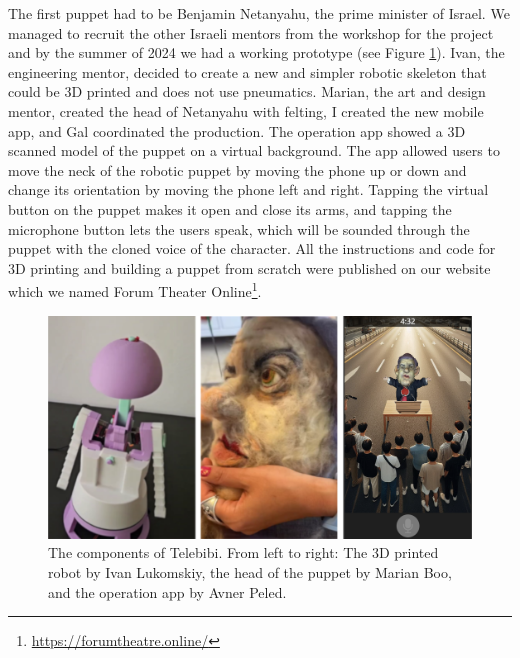 \documentclass[dissertation,math,vertlayout,pdfa,colorlinks]{aaltoseries}
\begin{document}
The first puppet had to be Benjamin Netanyahu, the prime minister of Israel. We managed to recruit the other Israeli mentors from the workshop for the project and by the summer of 2024 we had a working prototype (see Figure \ref{fig:telebibi-making}). Ivan, the engineering mentor, decided to create a new and simpler robotic skeleton that could be 3D printed and does not use pneumatics. Marian, the art and design mentor, created the head of Netanyahu with felting, I created the new mobile app, and Gal coordinated the production. The operation app showed a 3D scanned model of the puppet on a virtual background. The app allowed users to move the neck of the robotic puppet by moving the phone up or down and change its orientation by moving the phone left and right. Tapping the virtual button on the puppet makes it open and close its arms, and tapping the microphone button lets the users speak, which will be sounded through the puppet with the cloned voice of the character. All the instructions and code for 3D printing and building a puppet from scratch were published on our website which we named Forum Theater Online\footnote{\url{https://forumtheatre.online/}}.

\begin{figure}
    \includegraphics[width=1\linewidth]{telebibi-making.png}
    \caption{The components of Telebibi. From left to right: The 3D printed robot by Ivan Lukomskiy, the head of the puppet by Marian Boo, and the operation app by Avner Peled.}
    \label{fig:telebibi-making}
\end{figure}
\end{document}
